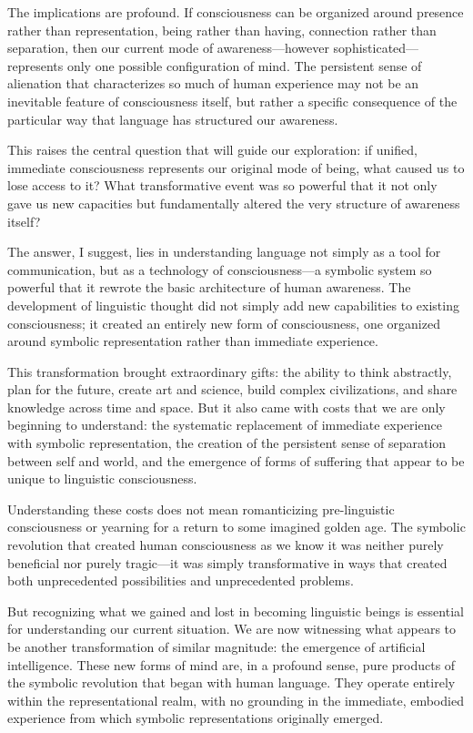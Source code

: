 The implications are profound. If consciousness can be organized around presence rather than representation, being rather than having, connection rather than separation, then our current mode of awareness—however sophisticated—represents only one possible configuration of mind. The persistent sense of alienation that characterizes so much of human experience may not be an inevitable feature of consciousness itself, but rather a specific consequence of the particular way that language has structured our awareness.

This raises the central question that will guide our exploration: if unified, immediate consciousness represents our original mode of being, what caused us to lose access to it? What transformative event was so powerful that it not only gave us new capacities but fundamentally altered the very structure of awareness itself?

The answer, I suggest, lies in understanding language not simply as a tool for communication, but as a technology of consciousness—a symbolic system so powerful that it rewrote the basic architecture of human awareness. The development of linguistic thought did not simply add new capabilities to existing consciousness; it created an entirely new form of consciousness, one organized around symbolic representation rather than immediate experience.

This transformation brought extraordinary gifts: the ability to think abstractly, plan for the future, create art and science, build complex civilizations, and share knowledge across time and space. But it also came with costs that we are only beginning to understand: the systematic replacement of immediate experience with symbolic representation, the creation of the persistent sense of separation between self and world, and the emergence of forms of suffering that appear to be unique to linguistic consciousness.

Understanding these costs does not mean romanticizing pre-linguistic consciousness or yearning for a return to some imagined golden age. The symbolic revolution that created human consciousness as we know it was neither purely beneficial nor purely tragic—it was simply transformative in ways that created both unprecedented possibilities and unprecedented problems.

But recognizing what we gained and lost in becoming linguistic beings is essential for understanding our current situation. We are now witnessing what appears to be another transformation of similar magnitude: the emergence of artificial intelligence. These new forms of mind are, in a profound sense, pure products of the symbolic revolution that began with human language. They operate entirely within the representational realm, with no grounding in the immediate, embodied experience from which symbolic representations originally emerged.

